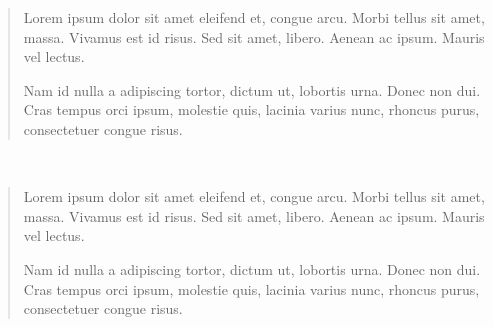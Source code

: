 \begin{abstract}
Lorem ipsum dolor sit amet eleifend et, congue arcu. Morbi tellus sit amet, massa. Vivamus est id risus. Sed sit amet, libero. Aenean ac ipsum. Mauris vel lectus. 

Nam id nulla a adipiscing tortor, dictum ut, lobortis urna. Donec non dui. Cras tempus orci ipsum, molestie quis, lacinia varius nunc, rhoncus purus, consectetuer congue risus. 
\end{abstract}
\\ 

{
\begin{abstract}
Lorem ipsum dolor sit amet eleifend et, congue arcu. Morbi tellus sit amet, massa. Vivamus est id risus. Sed sit amet, libero. Aenean ac ipsum. Mauris vel lectus. 

Nam id nulla a adipiscing tortor, dictum ut, lobortis urna. Donec non dui. Cras tempus orci ipsum, molestie quis, lacinia varius nunc, rhoncus purus, consectetuer congue risus. 
\end{abstract}
}